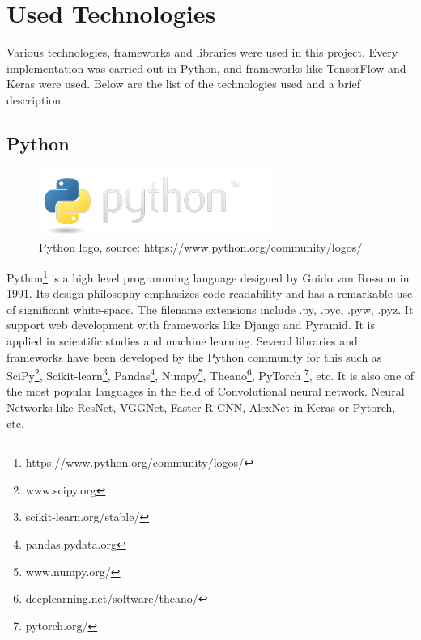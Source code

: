 \chapter{Used Technologies}\label{ch:Used Technologies}


Various technologies, frameworks and libraries were used in this project. Every implementation was carried out in Python, and frameworks like TensorFlow and Keras were used. Below are the list of the technologies used and a brief description.

\section{Python}

\begin{figure}[H]
    \centering
    \includegraphics[width=0.8\linewidth]{images/python-logo.png}
     \caption{Python logo, source: https://www.python.org/community/logos/}
  \end{figure}

Python\footnote{https://www.python.org/community/logos/} is a high level programming language designed by Guido van Rossum in 1991. Its design philosophy emphasizes code readability and has a remarkable use of significant white-space. The filename extensions include .py, .pyc, .pyw, .pyz. It support web development with frameworks like Django and Pyramid. It is applied in scientific studies and machine learning. Several libraries and frameworks have been developed by the Python community for this such as 
SciPy\footnote{www.scipy.org}, Scikit-learn\footnote{scikit-learn.org/stable/}, Pandas\footnote{pandas.pydata.org}, Numpy\footnote{www.numpy.org/}, Theano\footnote{deeplearning.net/software/theano/}, PyTorch \footnote{pytorch.org/}, etc. It is also one of the most popular languages in the field of Convolutional neural network. Neural Networks like ResNet, VGGNet, Faster R-CNN, AlexNet in Keras or Pytorch, etc. 

